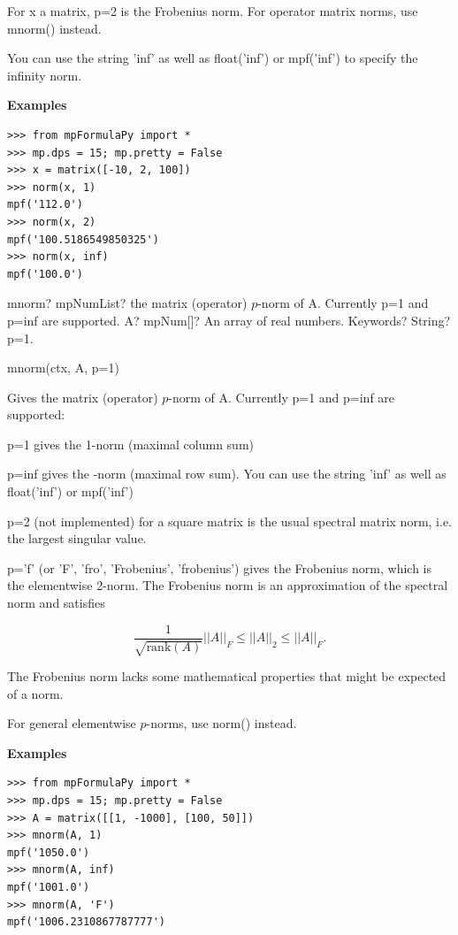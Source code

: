 For x a matrix, p=2 is the Frobenius norm. For operator matrix norms, use mnorm() instead.

You can use the string 'inf' as well as float('inf') or mpf('inf') to specify the infinity norm.

\vpara
\textbf{Examples}

\begin{lstlisting}
>>> from mpFormulaPy import *
>>> mp.dps = 15; mp.pretty = False
>>> x = matrix([-10, 2, 100])
>>> norm(x, 1)
mpf('112.0')
>>> norm(x, 2)
mpf('100.5186549850325')
>>> norm(x, inf)
mpf('100.0')
\end{lstlisting}


\vspace{0.6cm}

\begin{mpFunctionsExtract}
	\mpFunctionTwo
	{mnorm? mpNumList? the matrix (operator) $p$-norm of A. Currently p=1 and p=inf are supported.}
	{A? mpNum[]? An array of real numbers.}
	{Keywords? String?  p=1.}
\end{mpFunctionsExtract}


mnorm(ctx, A, p=1)

Gives the matrix (operator) $p$-norm of A. Currently p=1 and p=inf are supported:

p=1 gives the 1-norm (maximal column sum)

p=inf gives the -norm (maximal row sum). You can use the string 'inf' as well as float('inf') or mpf('inf')

p=2 (not implemented) for a square matrix is the usual spectral matrix norm, i.e. the largest singular value.

p='f' (or 'F', 'fro', 'Frobenius', 'frobenius') gives the Frobenius norm, which is the elementwise 2-norm. The Frobenius norm is an approximation of the spectral norm and satisfies

\begin{equation}
	\frac{1}{\sqrt{\text{rank}(A)}} ||A||_F \leq ||A||_2 \leq ||A||_F.
\end{equation}

The Frobenius norm lacks some mathematical properties that might be expected of a norm.

For general elementwise $p$-norms, use norm() instead.

\vpara
\textbf{Examples}

\begin{lstlisting}
>>> from mpFormulaPy import *
>>> mp.dps = 15; mp.pretty = False
>>> A = matrix([[1, -1000], [100, 50]])
>>> mnorm(A, 1)
mpf('1050.0')
>>> mnorm(A, inf)
mpf('1001.0')
>>> mnorm(A, 'F')
mpf('1006.2310867787777')
\end{lstlisting}





